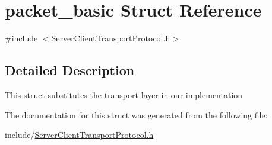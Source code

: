 \hypertarget{structpacket__basic}{}\section{packet\+\_\+basic Struct Reference}
\label{structpacket__basic}


{\ttfamily \#include $<$Server\+Client\+Transport\+Protocol.\+h$>$}



\subsection{Detailed Description}
This struct substitutes the transport layer in our implementation 

The documentation for this struct was generated from the following file\+:\begin{DoxyCompactItemize}
\item 
include/\hyperlink{_server_client_transport_protocol_8h}{Server\+Client\+Transport\+Protocol.\+h}\end{DoxyCompactItemize}
